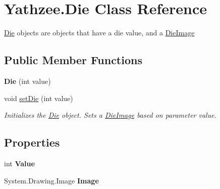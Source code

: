 \hypertarget{class_yathzee_1_1_die}{}\section{Yathzee.\+Die Class Reference}
\label{class_yathzee_1_1_die}


\hyperlink{class_yathzee_1_1_die}{Die} objects are objects that have a die value, and a \hyperlink{class_yathzee_1_1_die_image}{Die\+Image}  


\subsection*{Public Member Functions}
\begin{DoxyCompactItemize}
\item 
{\bfseries Die} (int value)\hypertarget{class_yathzee_1_1_die_afc6338fb4ec4ae9b874ceb7d23331665}{}\label{class_yathzee_1_1_die_afc6338fb4ec4ae9b874ceb7d23331665}

\item 
void \hyperlink{class_yathzee_1_1_die_a7b34d8689fa88e1f25269818636fe75c}{set\+Die} (int value)
\begin{DoxyCompactList}\small\item\em Initializes the \hyperlink{class_yathzee_1_1_die}{Die} object. Sets a \hyperlink{class_yathzee_1_1_die_image}{Die\+Image} based on parameter value. \end{DoxyCompactList}\end{DoxyCompactItemize}
\subsection*{Properties}
\begin{DoxyCompactItemize}
\item 
int {\bfseries Value}\hypertarget{class_yathzee_1_1_die_af7e17dadd808bcd0c4ba0d1b14ff4a9c}{}\label{class_yathzee_1_1_die_af7e17dadd808bcd0c4ba0d1b14ff4a9c}

\item 
System.\+Drawing.\+Image {\bfseries Image}\hypertarget{class_yathzee_1_1_die_ad589565a256b35774112e726b700be53}{}\label{class_yathzee_1_1_die_ad589565a256b35774112e726b700be53}

\end{DoxyCompactItemize}


